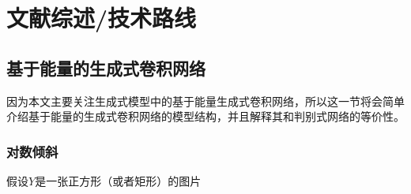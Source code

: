 \chapter{文献综述/技术路线}

\section{基于能量的生成式卷积网络}

因为本文主要关注生成式模型中的基于能量生成式卷积网络，所以这一节将会简单介绍基于能量的生成式卷积网络的模型结构，并且解释其和判别式网络的等价性。

\subsection{对数倾斜}
假设$Y$是一张正方形（或者矩形）的图片


